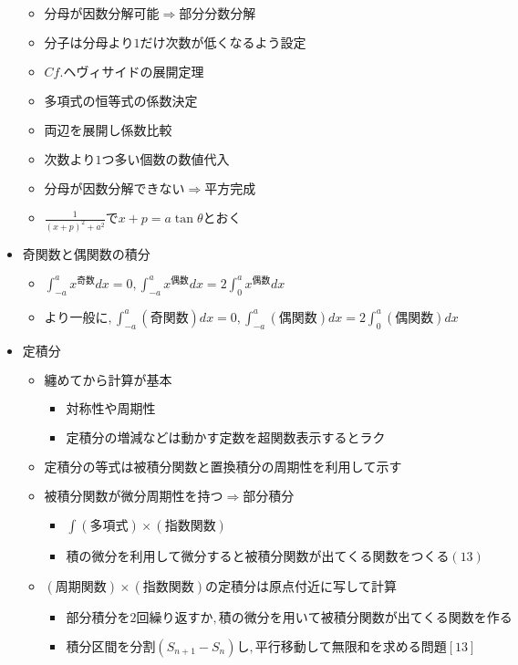 \documentclass[dvipdfmx,uplatex]{jsarticle}
\begin{document}
\begin{itemize}
	\begin{itemize}
		\item $ 分母が因数分解可能⇒部分分数分解$
		\item $  分子は分母より1だけ次数が低くなるよう設定$
		\item $ Cf. ヘヴィサイドの展開定理$
		\item $ 多項式の恒等式の係数決定$
		\item $ 両辺を展開し係数比較$
		\item $ 次数より1つ多い個数の数値代入$
		\item $ 分母が因数分解できない⇒平方完成$
		\item $ \frac{1}{(x + p)^2 + a^2} で x + p = a \tan \theta とおく$
	\end{itemize}
	\item $ 奇関数と偶関数の積分$
	\begin{itemize}
		\item $ \int^a_{-a} x^{奇数}dx = 0, \int^a_{-a} x^{偶数}dx = 2\int^a_0 x^{偶数}dx$
		\item $ より一般に, \int^a_{-a} (奇関数)dx = 0, \int^a_{-a} (偶関数)dx = 2\int^a_{0} (偶関数)dx$
	\end{itemize}
	\item $ 定積分$
	\begin{itemize}
		\item $ 纏めてから計算が基本$
		\begin{itemize}
			\item $ 対称性や周期性$
			\item $ 定積分の増減などは動かす定数を超関数表示するとラク$
		\end{itemize}
		\item $ 定積分の等式は被積分関数と置換積分の周期性を利用して示す$
		\item $ 被積分関数が微分周期性を持つ⇒部分積分$
		\begin{itemize}
			\item $ \int (多項式) \times (指数関数)$
			\item $ 積の微分を利用して微分すると被積分関数が出てくる関数をつくる(13)$
		\end{itemize}
		\item $ (周期関数) \times (指数関数) の定積分は原点付近に写して計算$
		\begin{itemize}
			\item $ 部分積分を2回繰り返すか,積の微分を用いて被積分関数が出てくる関数を作る$
			\item $ 積分区間を分割(S_{n+1} - S_n)し,平行移動して無限和を求める問題 [13]$

\end{itemize}
\end{itemize}
\end{itemize}
\end{document}
